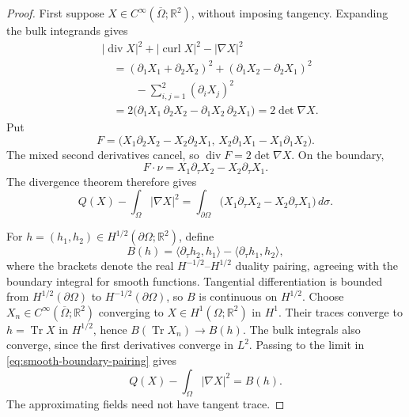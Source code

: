 \begin{proof}
First suppose $X\in C^\infty(\overline\Omega;\mathbb R^2)$, without
imposing tangency. Expanding the bulk integrands gives
\[
 \begin{aligned}
 &|\operatorname{div}X|^2+|\operatorname{curl}X|^2-|\nabla X|^2\\
 &\quad=(\partial_1X_1+\partial_2X_2)^2
        +(\partial_1X_2-\partial_2X_1)^2\\
 &\qquad\quad-\sum_{i,j=1}^2(\partial_iX_j)^2\\
 &\quad=2\bigl(\partial_1X_1\,\partial_2X_2
              -\partial_1X_2\,\partial_2X_1\bigr)
        =2\det\nabla X.
 \end{aligned}
\]
Put
\[
 F=\bigl(X_1\partial_2X_2-X_2\partial_2X_1,\,
         X_2\partial_1X_1-X_1\partial_1X_2\bigr).
\]
The mixed second derivatives cancel, so
$\operatorname{div}F=2\det\nabla X$. On the boundary,
\[
 F\cdot\nu=X_1\partial_\tau X_2-X_2\partial_\tau X_1.
\]
The divergence theorem therefore gives
\begin{equation}\label{eq:smooth-boundary-pairing}
 Q(X)-\int_\Omega|\nabla X|^2
 =\int_{\partial\Omega}
   \bigl(X_1\partial_\tau X_2-X_2\partial_\tau X_1\bigr)\,d\sigma.
\end{equation}

For $h=(h_1,h_2)\in H^{1/2}(\partial\Omega;\mathbb R^2)$, define
\[
 B(h)=\langle\partial_\tau h_2,h_1\rangle
       -\langle\partial_\tau h_1,h_2\rangle,
\]
where the brackets denote the real $H^{-1/2}$--$H^{1/2}$ duality
pairing, agreeing with the boundary integral for smooth functions.
Tangential differentiation is bounded from $H^{1/2}(\partial\Omega)$
to $H^{-1/2}(\partial\Omega)$, so $B$ is continuous on $H^{1/2}$.
Choose $X_n\in C^\infty(\overline\Omega;\mathbb R^2)$ converging to
$X\in H^1(\Omega;\mathbb R^2)$ in $H^1$. Their traces converge to
$h=\operatorname{Tr}X$ in $H^{1/2}$, hence
$B(\operatorname{Tr}X_n)\to B(h)$. The bulk integrals also converge,
since the first derivatives converge in $L^2$. Passing to the limit in
\cref{eq:smooth-boundary-pairing} gives
\begin{equation}\label{eq:sobolev-boundary-pairing}
 Q(X)-\int_\Omega|\nabla X|^2=B(h).
\end{equation}
The approximating fields need not have tangent trace.


\end{proof}
